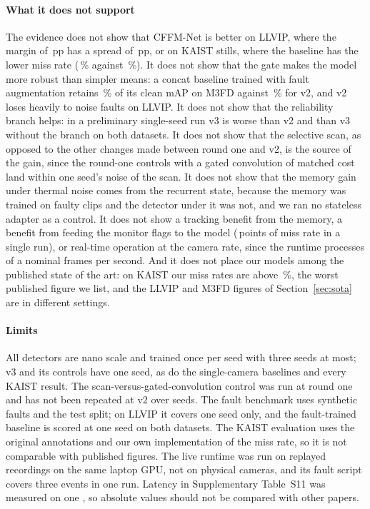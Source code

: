 \paragraph{What it does not support}
The evidence does not show that CFFM-Net is better on LLVIP, where the margin of \marLlvipVtwoVsConcatMdMeanMap{}\,pp has a spread of \marLlvipVtwoVsConcatMdStdMap{}\,pp, or on KAIST stills, where the baseline has the lower miss rate (\kstConcatAllMr{}\,\% against \kstCffmAllMr{}\,\%). It does not show that the gate makes the model more robust than simpler means: a concat baseline trained with fault augmentation retains \fltMfdConcatFtRetainedSevThreePercent{}\,\% of its clean mAP on M3FD against \fltMfdCffmVtwoMeanRetainedSevThreePercent{}\,\% for v2, and v2 loses heavily to noise faults on LLVIP. It does not show that the reliability branch helps: in a preliminary single-seed run v3 is worse than v2 and than v3 without the branch on both datasets. It does not show that the selective scan, as opposed to the other changes made between round one and v2, is the source of the gain, since the round-one controls with a gated convolution of matched cost land within one seed's noise of the scan. It does not show that the memory gain under thermal noise comes from the recurrent state, because the memory was trained on faulty clips and the detector under it was not, and we ran no stateless adapter as a control. It does not show a tracking benefit from the memory, a benefit from feeding the monitor flags to the model (\livFaultMrChange{}\,points of miss rate in a single run), or real-time operation at the camera rate, since the runtime processes \livSoakThirtyFps{} of a nominal \livSoakThirtyNominalFps{} frames per second. And it does not place our models among the published state of the art: on KAIST our miss rates are above \sotaKaistMrMax{}\,\%, the worst published figure we list, and the LLVIP and M3FD figures of Section~\ref{sec:sota} are in different settings.

\paragraph{Limits}
All detectors are nano scale and trained once per seed with three seeds at most; v3 and its controls have one seed, as do the single-camera baselines and every KAIST result. The scan-versus-gated-convolution control was run at round one and has not been repeated at v2 over seeds. The fault benchmark uses synthetic faults and the test split; on LLVIP it covers one seed only, and the fault-trained baseline is scored at one seed on both datasets. The KAIST evaluation uses the original annotations and our own implementation of the miss rate, so it is not comparable with published figures. The live runtime was run on replayed recordings on the same laptop GPU, not on physical cameras, and its fault script covers three events in one run. Latency in Supplementary Table~S11 was measured on one \latLocalDevice{}, so absolute values should not be compared with other papers.

